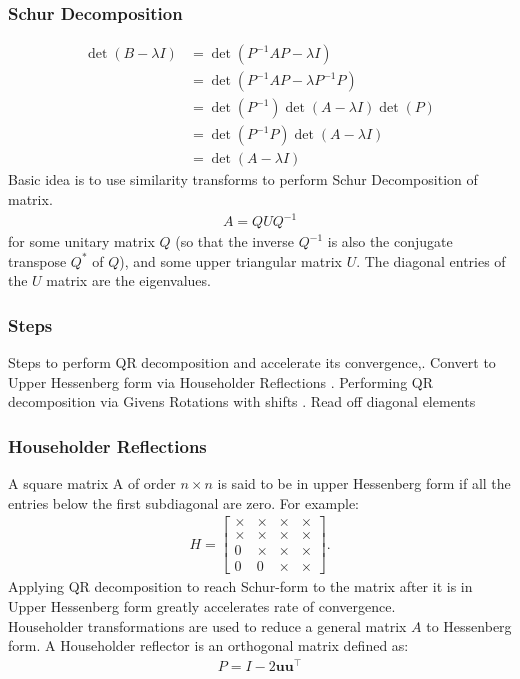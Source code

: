 \documentclass{beamer}
\theoremstyle{remark}
\numberwithin{equation}{section}
\begin{document}
    \begin{frame}
      \frametitle{Schur Decomposition}
      {\small
      \begin{align}
        \det(B-\lambda I)&=\det(P^{-1}AP -\lambda I)\\
        &=\det(P^{-1}AP -\lambda P^{-1}P)\\
        &=\det(P^{-1})\det(A-\lambda I)\det(P)\\
        &=\det(P^{-1}P)\det(A- \lambda I)\\
        &=\det(A-\lambda I)
      \end{align}
      }
      Basic idea is to use similarity transforms to perform Schur Decomposition of matrix.
      \begin{align}
        A = QUQ^{-1}
      \end{align}
      for some unitary matrix $Q$ (so that the inverse $Q^{-1}$ is also the conjugate transpose $Q^*$ 
      of $Q$), and some upper triangular matrix $U$. The diagonal entries of the $U$ matrix are 
      the eigenvalues.   
    \end{frame}
    \begin{frame}[fragile]
      \frametitle{Steps}
      Steps to perform QR decomposition and accelerate its convergence,. Convert to Upper Hessenberg form via Householder Reflections . Performing QR decomposition via Givens Rotations with shifts . Read off diagonal elements
    \end{frame}
    \begin{frame}
      \frametitle{Householder Reflections}
      A square matrix A of order $n \times n$ is said to be in upper Hessenberg form if all the entries below the first subdiagonal are zero.
      For example:
      {\small
      \begin{align}
        H = \begin{bmatrix}
          \times & \times & \times & \times \\
          \times & \times & \times & \times \\
          0 & \times & \times & \times \\
          0 & 0 & \times & \times
        \end{bmatrix}.
      \end{align}
      }
      Applying QR decomposition to reach Schur-form to the matrix after it is in Upper Hessenberg form greatly accelerates rate of convergence.\\
      Householder transformations are used to reduce a general matrix $A$ to Hessenberg form. A Householder reflector is an orthogonal matrix defined as:
      \begin{align}
        P = I - 2\textbf{uu}^{\top} \\
      \end{align}
    \end{frame}
\end{document}
